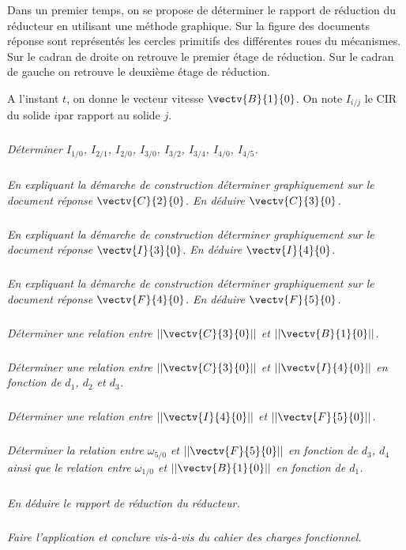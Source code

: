 \documentclass[10pt]{article}
\begin{document}
Dans un premier temps, on se propose de déterminer le rapport de réduction du réducteur en utilisant une méthode graphique. Sur la figure des documents réponse sont représentés les cercles primitifs des différentes roues du mécanismes. Sur le cadran de droite on retrouve le premier étage de réduction. Sur le cadran de gauche on retrouve le deuxième étage de réduction.

A l'instant $t$, on donne le vecteur vitesse $\vectv{B}{1}{0}$. On note $I_{i/j}$ le CIR du solide $i$par rapport au solide $j$.

\subparagraph{}
\textit{Déterminer $I_{1/0}$, $I_{2/1}$, $I_{2/0}$, $I_{3/0}$, $I_{3/2}$, $I_{3/4}$, $I_{4/0}$, $I_{4/5}$.}


\subparagraph{}
\textit{En expliquant la démarche de construction déterminer graphiquement sur le document réponse $\vectv{C}{2}{0}$. En déduire $\vectv{C}{3}{0}$.}

\subparagraph{}
\textit{En expliquant la démarche de construction déterminer graphiquement sur le document réponse $\vectv{I}{3}{0}$. En déduire $\vectv{I}{4}{0}$.}

\subparagraph{}
\textit{En expliquant la démarche de construction déterminer graphiquement sur le document réponse $\vectv{F}{4}{0}$. En déduire $\vectv{F}{5}{0}$.}

\subparagraph{}
\textit{Déterminer une relation entre $||\vectv{C}{3}{0}||$ et $||\vectv{B}{1}{0}||$.}

\subparagraph{}
\textit{Déterminer une relation entre $||\vectv{C}{3}{0}||$ et $||\vectv{I}{4}{0}||$ en fonction de $d_1$, $d_2$ et $d_3$.}

\subparagraph{}
\textit{Déterminer une relation entre $||\vectv{I}{4}{0}||$ et $||\vectv{F}{5}{0}||$.}

\subparagraph{}
\textit{Déterminer la relation entre $\omega_{5/0}$ et $||\vectv{F}{5}{0}||$ en fonction de $d_3$, $d_4$ ainsi que le relation entre $\omega_{1/0}$ et $||\vectv{B}{1}{0}||$ en fonction de $d_1$.}

\subparagraph{}
\textit{En déduire le rapport de réduction du réducteur.}

\subparagraph{}
\textit{Faire l'application et conclure vis-à-vis du cahier des charges fonctionnel.}


\begin{center}
\end{center}
\end{document}
